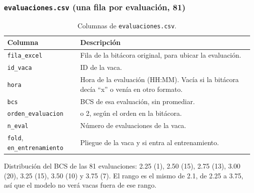 \subsubsection*{\texttt{evaluaciones.csv} (una fila por evaluación, 81)}

\begin{table}[H]
  \centering
  \small
  \caption{Columnas de \texttt{evaluaciones.csv}.}
  \label{tab:col-evaluaciones}
  \begin{tabularx}{\textwidth}{>{\raggedright\arraybackslash}p{}>{\raggedright\arraybackslash}X}
    \toprule
    Columna & Descripción \\
    \midrule
    \texttt{fila\_excel} & Fila de la bitácora original, para ubicar la evaluación. \\
    \texttt{id\_vaca} & ID de la vaca. \\
    \texttt{hora} & Hora de la evaluación (HH:MM). Vacía si la bitácora decía ``x'' o venía en otro formato. \\
    \texttt{bcs} & BCS de esa evaluación, sin promediar. \\
    \texttt{orden\_evaluacion} & 1 o 2, según el orden en la bitácora. \\
    \texttt{n\_eval} & Número de evaluaciones de la vaca. \\
    \texttt{fold}, \texttt{en\_entrenamiento} & Pliegue de la vaca y si entra al entrenamiento. \\
    \bottomrule
  \end{tabularx}
\end{table}

Distribución del BCS de las 81 evaluaciones: 2.25 (1), 2.50 (15), 2.75 (13), 3.00 (20), 3.25 (15), 3.50 (10) y 3.75 (7). El rango es el mismo de 2.1, de 2.25 a 3.75, así que el modelo no verá vacas fuera de ese rango.
